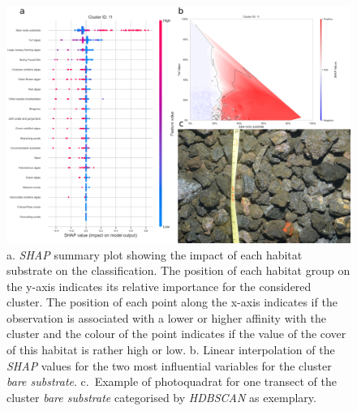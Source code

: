 \begin{figure}
\hypertarget{fig:chap2figS31}{%
\centering
\includegraphics{03-Chapitre2/figures/supplementary/05-explanation_shap_pq_cluster_11.png}
\caption{a. \emph{SHAP} summary plot showing the impact of each habitat
substrate on the classification. The position of each habitat group on
the y-axis indicates its relative importance for the considered cluster.
The position of each point along the x-axis indicates if the observation
is associated with a lower or higher affinity with the cluster and the
colour of the point indicates if the value of the cover of this habitat
is rather high or low. b. Linear interpolation of the \emph{SHAP} values
for the two most influential variables for the cluster \emph{bare
substrate}. c.~Example of photoquadrat for one transect of the cluster
\emph{bare substrate} categorised by \emph{HDBSCAN} as
exemplary.}\label{fig:chap2figS31}
}
\end{figure}

